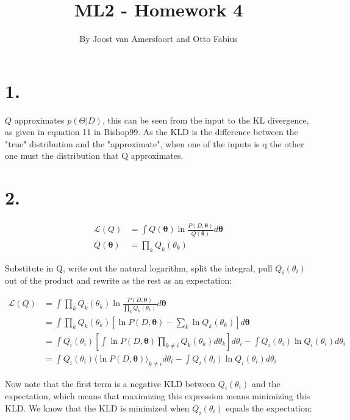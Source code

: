 \documentclass{article}
\def\*#1{\boldsymbol{#1}}
\begin{document}
\title{ML2 - Homework 4}
\author{By Joost van Amersfoort and Otto Fabius}
\maketitle

\section*{1.}

$Q$ approximates $p(\Theta|D)$, this can be seen from the input to the KL divergence, as given in equation 11 in Bishop99. As the KLD is the difference between the "true" distribution and the "approximate", when one of the inputs is q the other one must the distribution that Q approximates.

\section*{2.}

\begin{align*}
\mathcal{L}(Q) &= \int Q(\*\theta) \ln \frac{P(D, \*\theta)}{Q(\*\theta)}d\*\theta \\
Q(\*\theta) &= \prod_k Q_k(\theta_k)
\end{align*}

Substitute in Q, write out the natural logarithm, split the integral, pull $Q_i(\theta_i)$ out of the product and rewrite as the rest as an expectation:

\begin{align*}
\mathcal{L}(Q) &= \int \prod_k Q_k(\theta_k) \ln \frac{P(D, \*\theta)}{\prod_k Q_k(\theta_k)}d\*\theta \\
&= \int \prod_k Q_k(\theta_k) \left [ \ln P(D, \*\theta) - \sum_k \ln Q_k(\theta_k) \right ] d\*\theta \\
&= \int Q_i(\theta_i) \left [ \int \ln P(D, \*\theta) \prod_{k \neq i} Q_k(\theta_k) d\theta_k \right ] d\theta_i - \int Q_i(\theta_i) \ln Q_i(\theta_i) d\theta_i \\
&= \int Q_i(\theta_i) \langle \ln P(D, \*\theta) \rangle_{k \neq i} d\theta_i - \int Q_i(\theta_i) \ln Q_i(\theta_i) d\theta_i
\end{align*}

Now note that the first term is a negative KLD between $Q_i(\theta_i)$ and the expectation, which means that maximizing this expression means minimizing this KLD. We know that the KLD is minimized when $Q_i(\theta_i)$ equals the expectation:
\end{document}
